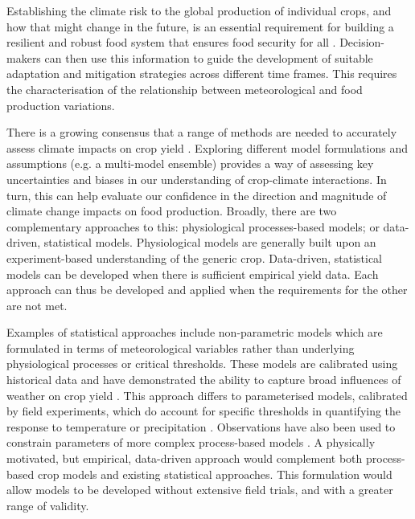 \documentclass[12pt]{article}
\begin{document}
Establishing the climate risk to the global production of individual crops, and how that might change in the future, is an essential requirement for building a resilient and robust food system that ensures food security for all \citep[][]{fao:2002}. Decision-makers can then use this information to guide the development of suitable adaptation and mitigation strategies across different time frames. This requires the characterisation of the relationship between meteorological and food production variations.

There is a growing consensus that a range of methods are needed to accurately assess climate impacts on crop yield \citep[e.g.][]{lobell:2017, tigchelaar:2018, snyder:2018}. Exploring different model formulations and assumptions (e.g. a multi-model ensemble) provides a way of assessing key uncertainties and biases in our understanding of crop-climate interactions. In turn, this can help evaluate our confidence in the direction and magnitude of climate change impacts on food production. Broadly, there are two complementary approaches to this:  physiological processes-based models; or data-driven, statistical models. Physiological models are generally built upon an experiment-based understanding of the generic crop. Data-driven, statistical models can be developed when there is sufficient empirical yield data. Each approach can thus be developed and applied when the requirements for the other are not met.

Examples of statistical approaches include non-parametric models which are formulated in terms of meteorological variables rather than underlying physiological processes or critical thresholds. These models are calibrated using historical data and have demonstrated the ability to capture broad influences of weather on crop yield \citep[e.g.][]{schlenker:2009, lobell:2010, welch:2010}. This approach differs to parameterised models, calibrated by field experiments, which do account for specific thresholds in quantifying the response to temperature \citep[e.g.][]{cutforth:1990, yin:1995, wang:1998, yan:1999, streck:2007, zhou:2018} or precipitation \citep[e.g.][]{cakir:2004, ge:2012, lobell:2013, carter:2016, song:2019}. Observations have also been used to constrain parameters of more complex process-based models \citep[e.g.][]{iizumi:2009, tao:2009}. A physically motivated, but empirical, data-driven approach would complement both process-based crop models and existing statistical approaches. This formulation would allow models to be developed without extensive field trials, and with a greater range of validity. 
\end{document}
